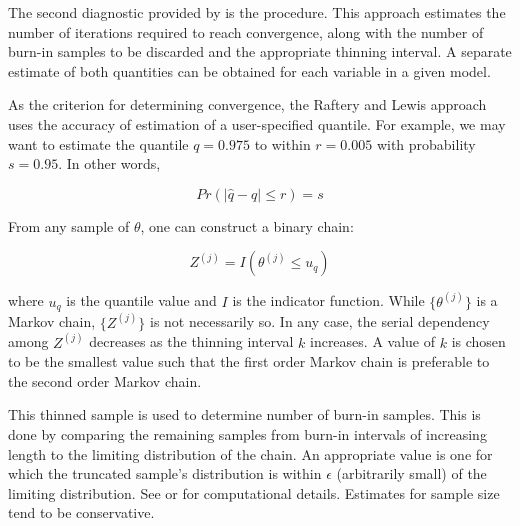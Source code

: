 \documentclass[]{jss}
\begin{document}
The second diagnostic provided by  is the \citet{raftery} procedure. This approach estimates the number of iterations required to reach convergence, along with the number of burn-in samples to be discarded and the appropriate thinning interval. A separate estimate of both quantities can be obtained for each variable in a given model.

As the criterion for determining convergence, the Raftery and Lewis approach uses the accuracy of estimation of a user-specified quantile. For example, we may want to estimate the quantile $q=0.975$ to within $r=0.005$ with probability $s=0.95$. In other words,

\begin{equation}
  Pr(|\hat{q}-q| \le r) = s
\end{equation}

From any sample of $\theta$, one can construct a binary chain:

\begin{equation}
  Z^{(j)} = I(\theta^{(j)} \le u_q)
\end{equation}

where $u_q$ is the quantile value and $I$ is the indicator function. While $\{\theta^{(j)}\}$ is a Markov chain, $\{Z^{(j)}\}$ is not necessarily so. In any case, the serial dependency among $Z^{(j)}$ decreases as the thinning interval $k$ increases. A value of $k$ is chosen to be the smallest value such that the first order Markov chain is preferable to the second order Markov chain.

This thinned sample is used to determine number of burn-in samples. This is done by comparing the remaining samples from burn-in intervals of increasing length to the limiting distribution of the chain. An appropriate value is one for which the truncated sample's distribution is within $\epsilon$ (arbitrarily small) of the limiting distribution. See \citet{raftery} or \citet{Gamerman:1997tb} for computational details. Estimates for sample size tend to be conservative.
\end{document}
